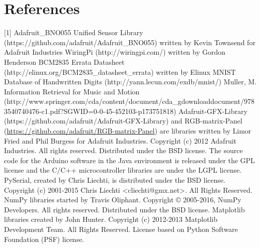 \documentclass{sig-alternate-05-2015}
\begin{document}
\section{References}
[1] Adafruit\_BNO055 Unified Sensor Library (https://github\newline .com/adafruit/Adafruit\_BNO055) written by Kevin Townsend for Adafruit Industries
\newline
\newline
[2] WiringPi (http://wiringpi.com/) written by Gordon Henderson
\newline
\newline
[3] BCM2835 Errata Datasheet (http://elinux.org/BCM2835\newline \_datasheet\_errata) written by Elinux
\newline
\newline
[4] MNIST Database of Handwritten Digits (http://yann.lecun.com\newline /exdb/mnist/)
\newline
\newline
[5] Muller, M. Information Retrieval for Music and Motion (http://www.springer.com/cda/content/document/cda\_\newline gdownloaddocument/9783540740476-c1.pdf?SGWID=0-0-45-452103-p173751818)
\newline
\newline
[6] Adafruit-GFX-Library (https://github.com/adafruit/Adafruit-GFX-Library) and RGB-matrix-Panel (\url{https://github.com/adafruit/RGB-matrix-Panel}) are libraries written by Limor Fried and Phil Burgess for Adafruit Industries. Copyright (c) 2012 Adafruit Industries. All rights reserved. Distributed under the BSD license.
\newline
\newline
[7] The source code for the Arduino software in the Java environment is released under the GPL license and the C/C++ microcontroller libraries are under the LGPL license.
\newline
\newline
[8] PySerial, created by Chris Liechti, is distributed under the BSD license. Copyright (c) 2001-2015 Chris Liechti <cliechti@gmx.net>. All Rights Reserved.
\newline
\newline
[9] NumPy libraries started by Travis Oliphant. Copyright © 2005-2016, NumPy Developers. All rights reserved. Distributed under the BSD license.
\newline
\newline
[10] Matplotlib libraries created by John Hunter. Copyright (c) 2012-2013 Matplotlib Development Team. All Rights Reserved. License based on Python Software Foundation (PSF) license.
\newline
\newline
\end{document}
